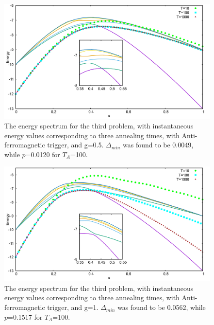 \documentclass[12]{article}
\begin{document}
\begin{figure}[H]
\centering 
\includegraphics[scale=0.3]{528_s12_A_g0.png}
\caption{The energy spectrum for the third problem, with instantaneous energy values corresponding to three annealing times, with Anti-ferromagnetic trigger, and g=0.5. $\Delta_{min}$ was found to be 0.0049, while $p$=0.0120 for $T_A$=100. }
\label{fig:a7}
\end{figure}
\begin{figure}[H]
\centering 
\includegraphics[scale=0.3]{528_s12_A_g1.png}
\caption{The energy spectrum for the third problem, with instantaneous energy values corresponding to three annealing times, with Anti-ferromagnetic trigger, and g=1. $\Delta_{min}$ was found to be 0.0562, while $p$=0.1517 for $T_A$=100. }
\label{fig:a8}
\end{figure}
\end{document}
